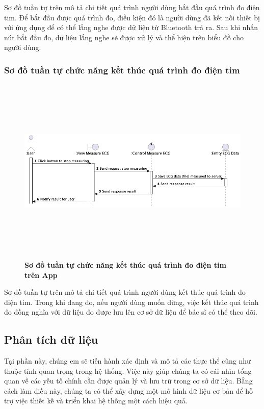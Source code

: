   Sơ đồ tuần tự trên mô tả chi tiết quá trình người dùng bắt đầu quá trình đo điện tim. Để bắt đầu được quá trình đo, điều
  kiện đó là người dùng đã kết nối thiết bị với ứng dụng để có thể lắng nghe được dữ liệu từ Bluetooth trả ra. Sau khi nhấn nút bắt đầu đo,
  dữ liệu lắng nghe sẽ được xử lý và thể hiện trên biểu đồ cho người dùng.

\subsubsection{Sơ đồ tuần tự chức năng kết thúc quá trình đo điện tim}

  \begin{figure}[H]
        \centering
        \includegraphics[width=16cm,height=9cm]{Images/mobile_app/end_measuring_ecg.png}
        \caption[Sơ đồ tuần tự chức năng kết thúc quá trình đo điện tim trên App]{\bfseries \fontsize{12pt}{0pt}
        \selectfont Sơ đồ tuần tự chức năng kết thúc quá trình đo điện tim trên App}
        \label{end_measuring_ecg} %
  \end{figure}

  Sơ đồ tuần tự trên mô tả chi tiết quá trình người dùng kết thúc quá trình đo điện tim. Trong khi đang đo, nếu người dùng muốn dừng, 
  việc kết thúc quá trình đo đồng nghĩa với dữ liệu đo được lưu lên cơ sở dữ liệu để bác sĩ có thể theo dõi.

\subsection{Phân tích dữ liệu}

Tại phần này, chúng em sẽ tiến hành xác định và mô tả các thực thể cũng như
 thuộc tính quan trọng trong hệ thống. Việc này giúp chúng ta có cái
  nhìn tổng quan về các yếu tố chính cần được quản lý và lưu trữ
   trong cơ sở dữ liệu. Bằng cách làm điều này, chúng ta có thể
    xây dựng một mô hình dữ liệu cơ bản để hỗ trợ việc thiết kế và
     triển khai hệ thống một cách hiệu quả.

